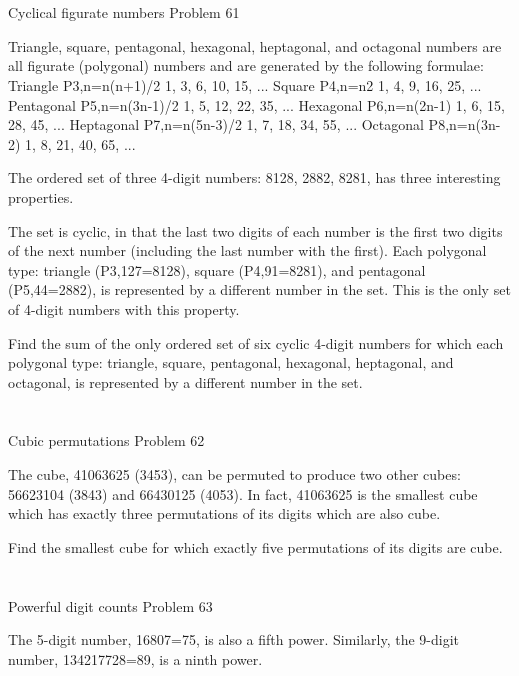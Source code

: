 \section{} \label{pb.061}
Cyclical figurate numbers
Problem 61

Triangle, square, pentagonal, hexagonal, heptagonal, and octagonal numbers are all figurate (polygonal) numbers and are generated by the following formulae:
Triangle 	  	P3,n=n(n+1)/2 	  	1, 3, 6, 10, 15, ...
Square 	  	P4,n=n2 	  	1, 4, 9, 16, 25, ...
Pentagonal 	  	P5,n=n(3n-1)/2 	  	1, 5, 12, 22, 35, ...
Hexagonal 	  	P6,n=n(2n-1) 	  	1, 6, 15, 28, 45, ...
Heptagonal 	  	P7,n=n(5n-3)/2 	  	1, 7, 18, 34, 55, ...
Octagonal 	  	P8,n=n(3n-2) 	  	1, 8, 21, 40, 65, ...

The ordered set of three 4-digit numbers: 8128, 2882, 8281, has three interesting properties.

    The set is cyclic, in that the last two digits of each number is the first two digits of the next number (including the last number with the first).
    Each polygonal type: triangle (P3,127=8128), square (P4,91=8281), and pentagonal (P5,44=2882), is represented by a different number in the set.
    This is the only set of 4-digit numbers with this property.

Find the sum of the only ordered set of six cyclic 4-digit numbers for which each polygonal type: triangle, square, pentagonal, hexagonal, heptagonal, and octagonal, is represented by a different number in the set.

\section{} \label{pb.062}
Cubic permutations
Problem 62

The cube, 41063625 (3453), can be permuted to produce two other cubes: 56623104 (3843) and 66430125 (4053). In fact, 41063625 is the smallest cube which has exactly three permutations of its digits which are also cube.

Find the smallest cube for which exactly five permutations of its digits are cube.

\section{} \label{pb.063}
Powerful digit counts
Problem 63

The 5-digit number, 16807=75, is also a fifth power. Similarly, the 9-digit number, 134217728=89, is a ninth power.

